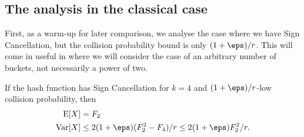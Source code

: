 \subsection{The analysis in the classical case}
First, as a warm-up for later comparison, we analyse the
case where we have Sign Cancellation, but
the collision probability bound is only $(1+\eps)/r$.
This will come in useful in  where we will consider the case of an arbitrary number of buckets, not necessarily a power of two.
\begin{lemma}\label{lem:count-classic}
   If the hash function has Sign Cancellation for $k = 4$ and $(1+\eps)/r$-low collision probability, then
    \begin{align}
        \E[X] &= F_2 \\
        \Var[X] &\le 2(1 + \eps)(F_2^2 - F_4)/r \le 2(1 + \eps)F_2^2/r .
    \end{align}
\end{lemma}
